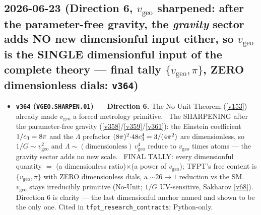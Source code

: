 \subsection*{2026-06-23 (Direction 6, $v_{\mathrm{geo}}$ sharpened: after the parameter-free gravity, the \emph{gravity} sector adds NO new dimensionful input either, so $v_{\mathrm{geo}}$ is the SINGLE dimensionful input of the complete theory --- final tally $\{v_{\mathrm{geo}},\pi\}$, ZERO dimensionless dials: \texttt{v364})}
\begin{itemize}
\item \textbf{\texttt{v364} (\texttt{VGEO.SHARPEN.01}) --- Direction 6.} The No-Unit Theorem (\vref{v153}) already made
$v_{\mathrm{geo}}$ a forced metrology primitive. \mE\ The SHARPENING after the parameter-free gravity
(\vref{v358}/\vref{v359}/\vref{v361}): the Einstein coefficient $1/c_3=8\pi$ and the $\Lambda$ prefactor
$(8\pi)^2{\cdot}48c_3^4=3/(4\pi^2)$ are dimensionless, so $1/G\sim v_{\mathrm{geo}}^2$ and
$\Lambda\sim(\text{dimensionless})\,v_{\mathrm{geo}}^4$ reduce to $v_{\mathrm{geo}}$ times atoms --- the gravity sector
adds no new scale. \mE\ FINAL TALLY: every dimensionful quantity $=$ (a dimensionless ratio)$\times$(a power of
$v_{\mathrm{geo}}$); TFPT's free content is $\{v_{\mathrm{geo}},\pi\}$ with ZERO dimensionless dials, a ${\sim}26\to1$
reduction vs the SM. \mO\ $v_{\mathrm{geo}}$ stays irreducibly primitive (No-Unit; $1/G$ UV-sensitive, Sakharov
\vref{v68}). Direction 6 is clarity --- the last dimensionful anchor named and shown to be the only one. Cited in
\texttt{tfpt\_research\_contracts}; Python-only.
\end{itemize}

